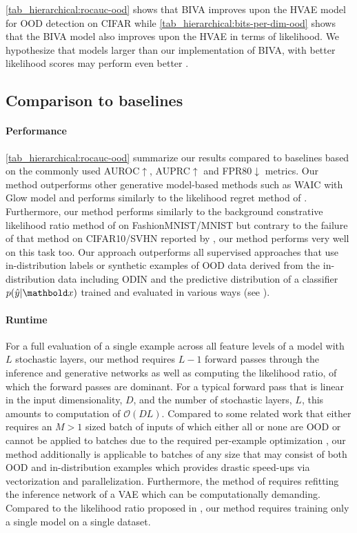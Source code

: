 {\cref{tab_hierarchical:rocauc-ood} shows that BIVA improves upon the HVAE model for OOD detection on CIFAR while \cref{tab_hierarchical:bits-per-dim-ood} shows that the BIVA model also improves upon the HVAE in terms of likelihood.
We hypothesize that models larger than our implementation of BIVA, with better likelihood scores may perform even better \parencite{maaloe_biva_2019, vahdat_nvae_2020, child_very_2021}.


\subsection{Comparison to baselines}
\paragraph{Performance} \cref{tab_hierarchical:rocauc-ood} summarize our results compared to baselines based on the commonly used AUROC$\uparrow$, AUPRC$\uparrow$ and FPR80$\downarrow$ metrics.
Our method outperforms other generative model-based methods such as WAIC \parencite{choi_waic_2019} with Glow model and performs similarly to the likelihood regret method of \parencite{xiao_likelihood_2020}.
Furthermore, our method performs similarly to the background constrative likelihood ratio method of \textcite{ren_likelihood_2019} on FashionMNIST/MNIST but contrary to the failure of that method on CIFAR10/SVHN reported by \parencite{xiao_likelihood_2020}, our method performs very well on this task too.
Our approach outperforms all supervised approaches that use in-distribution labels or synthetic examples of OOD data derived from the in-distribution data including ODIN \parencite{liang_enhancing_2018} and the predictive distribution of a classifier $p(\hat{y}|\xb)$ trained and evaluated in various ways (see \textcite{ren_likelihood_2019}).

\paragraph{Runtime} For a full evaluation of a single example across all feature levels of a model with $L$ stochastic layers, our method requires $L-1$ forward passes through the inference and generative networks as well as computing the likelihood ratio, of which the forward passes are dominant.
For a typical forward pass that is linear in the input dimensionality, $D$, and the number of stochastic layers, $L$, this amounts to computation of $\mathcal{O}(DL)$.
Compared to some related work that either requires an $M>1$ sized batch of inputs of which either all or none are OOD \parencite{nalisnick_detecting_2019} or cannot be applied to batches due to the required per-example optimization \parencite{xiao_likelihood_2020}, our method additionally is applicable to batches of any size that may consist of both OOD and in-distribution examples which provides drastic speed-ups via vectorization and parallelization.
Furthermore, the method of \textcite{xiao_fashionmnist_2017} requires refitting the inference network of a VAE which can be computationally demanding.
Compared to the likelihood ratio proposed in \textcite{ren_likelihood_2019}, our method requires training only a single model on a single dataset.


}
